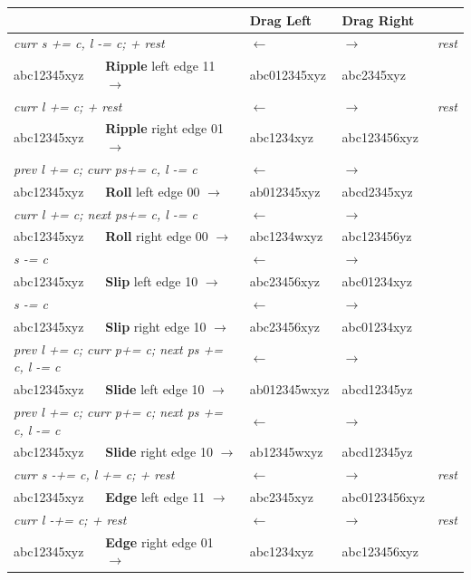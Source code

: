 \begin{longtable}{lllll}
		\toprule
		&  & \textbf{Drag Left} & \textbf{Drag Right} &\\
		\midrule
		\multicolumn{2}{l}{\textit{curr s += c, l -= c; + rest}} & $\leftarrow$ & $\rightarrow$ & \textit{rest}\\
		abc12345xyz & \textbf{Ripple} left edge 11 $\rightarrow$ & abc012345xyz & abc2345xyz &\\
		\midrule
		\multicolumn{2}{l}{\textit{curr l += c; + rest}} & $\leftarrow$ & $\rightarrow$ & \textit{rest}\\
		abc12345xyz & \textbf{Ripple} right edge 01 $\rightarrow$ & abc1234xyz & abc123456xyz &\\
		\midrule
		\multicolumn{2}{l}{\textit{prev l += c; curr ps+= c, l -= c}} & $\leftarrow$ & $\rightarrow$ &\\
		abc12345xyz & \textbf{Roll} left edge 00 $\rightarrow$ & ab012345xyz & abcd2345xyz &\\
		\midrule
		\multicolumn{2}{l}{\textit{curr l += c; next ps+= c, l -= c}} & $\leftarrow$ & $\rightarrow$ &\\
		abc12345xyz & \textbf{Roll} right edge 00 $\rightarrow$ & abc1234wxyz & abc123456yz &\\
		\midrule
		\multicolumn{2}{l}{\textit{s -= c}} & $\leftarrow$ & $\rightarrow$ &\\
		abc12345xyz & \textbf{Slip} left edge 10 $\rightarrow$ & abc23456xyz & abc01234xyz &\\
		\midrule
		\multicolumn{2}{l}{\textit{s -= c}} & $\leftarrow$ & $\rightarrow$ &\\
		abc12345xyz & \textbf{Slip} right edge 10 $\rightarrow$ & abc23456xyz & abc01234xyz &\\
		\midrule
		\multicolumn{2}{l}{\textit{prev l += c; curr p+= c; next ps += c, l -= c}} & $\leftarrow$ & $\rightarrow$ &\\
		abc12345xyz & \textbf{Slide} left edge 10 $\rightarrow$ & ab012345wxyz & abcd12345yz &\\
		\midrule
		\multicolumn{2}{l}{\textit{prev l += c; curr p+= c; next ps += c, l -= c}} & $\leftarrow$ & $\rightarrow$ &\\
		abc12345xyz & \textbf{Slide} right edge 10 $\rightarrow$ & ab12345wxyz & abcd12345yz &\\
		\midrule
		\multicolumn{2}{l}{\textit{curr s -+= c, l += c; + rest}} & $\leftarrow$ & $\rightarrow$ & \textit{rest}\\
		abc12345xyz & \textbf{Edge} left edge 11 $\rightarrow$ & abc2345xyz & abc0123456xyz &\\
		\midrule
		\multicolumn{2}{l}{\textit{curr l -+= c; + rest}} & $\leftarrow$ & $\rightarrow$ & \textit{rest}\\
		abc12345xyz & \textbf{Edge} right edge 01 $\rightarrow$ & abc1234xyz & abc123456xyz &\\
		\bottomrule
\end{longtable}
\renewcommand{\arraystretch}{1}

